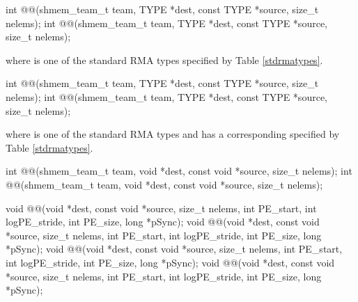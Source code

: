 
\begin{apidefinition}

{\color{Green}
\begin{C11synopsis}
int @@(shmem_team_t team, TYPE *dest, const TYPE *source, size_t nelems);
int @@(shmem_team_t team, TYPE *dest, const TYPE *source, size_t nelems);
\end{C11synopsis}
where \TYPE{} is one of the standard \ac{RMA} types specified by Table \ref{stdrmatypes}.
}

\begin{Csynopsis}
\end{Csynopsis}
{\color{Green}
\begin{CsynopsisCol}
int @@(shmem_team_t team, TYPE *dest, const TYPE *source, size_t nelems);
int @@(shmem_team_t team, TYPE *dest, const TYPE *source, size_t nelems);
\end{CsynopsisCol}
where \TYPE{} is one of the standard \ac{RMA} types and has a corresponding \TYPENAME{} specified by Table \ref{stdrmatypes}.

\begin{CsynopsisCol}
int @@(shmem_team_t team, void *dest, const void *source, size_t nelems);
int @@(shmem_team_t team, void *dest, const void *source, size_t nelems);
\end{CsynopsisCol}

}
\begin{DeprecateBlock}
\begin{CsynopsisCol}
void @@(void *dest, const void *source, size_t nelems, int PE_start, int logPE_stride, int PE_size, long *pSync);
void @@(void *dest, const void *source, size_t nelems, int PE_start, int logPE_stride, int PE_size, long *pSync);
void @@(void *dest, const void *source, size_t nelems, int PE_start, int logPE_stride, int PE_size, long *pSync);
void @@(void *dest, const void *source, size_t nelems, int PE_start, int logPE_stride, int PE_size, long *pSync);
\end{CsynopsisCol}
\end{DeprecateBlock}


\end{apidefinition}

